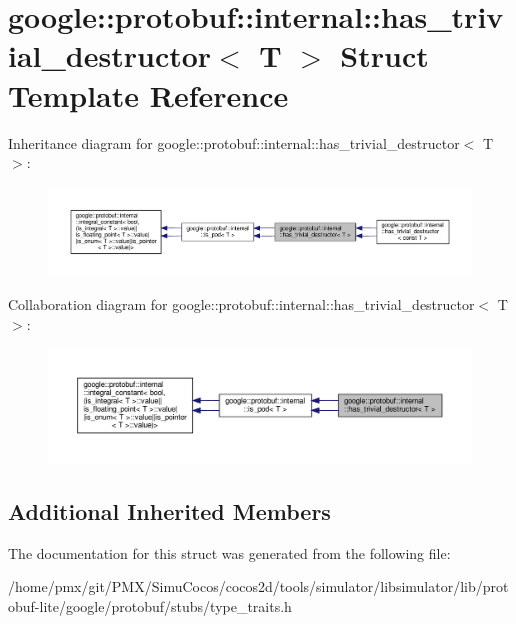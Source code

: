 \hypertarget{structgoogle_1_1protobuf_1_1internal_1_1has__trivial__destructor}{}\section{google\+:\+:protobuf\+:\+:internal\+:\+:has\+\_\+trivial\+\_\+destructor$<$ T $>$ Struct Template Reference}
\label{structgoogle_1_1protobuf_1_1internal_1_1has__trivial__destructor}


Inheritance diagram for google\+:\+:protobuf\+:\+:internal\+:\+:has\+\_\+trivial\+\_\+destructor$<$ T $>$\+:
\nopagebreak
\begin{figure}[H]
\begin{center}
\leavevmode
\includegraphics[width=350pt]{structgoogle_1_1protobuf_1_1internal_1_1has__trivial__destructor__inherit__graph}
\end{center}
\end{figure}


Collaboration diagram for google\+:\+:protobuf\+:\+:internal\+:\+:has\+\_\+trivial\+\_\+destructor$<$ T $>$\+:
\nopagebreak
\begin{figure}[H]
\begin{center}
\leavevmode
\includegraphics[width=350pt]{structgoogle_1_1protobuf_1_1internal_1_1has__trivial__destructor__coll__graph}
\end{center}
\end{figure}
\subsection*{Additional Inherited Members}


The documentation for this struct was generated from the following file\+:\begin{DoxyCompactItemize}
\item 
/home/pmx/git/\+P\+M\+X/\+Simu\+Cocos/cocos2d/tools/simulator/libsimulator/lib/protobuf-\/lite/google/protobuf/stubs/type\+\_\+traits.\+h\end{DoxyCompactItemize}

